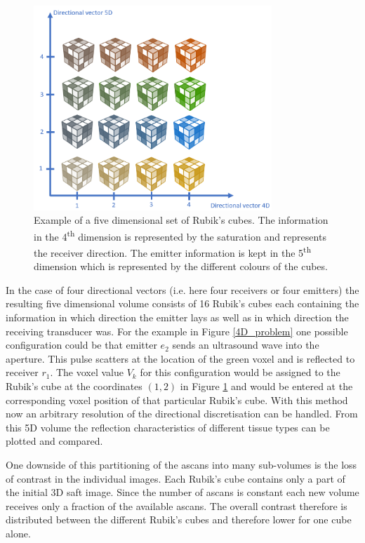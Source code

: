 \begin{figure}[H]
    \centering
    \includegraphics[width=0.8\textwidth]{Graphics/rubicscube5D.png}
    \caption{Example of a five dimensional set of Rubik's cubes. The information in the 4\textsuperscript{th} dimension is represented by the saturation and represents the receiver direction. The emitter information is kept in the 5\textsuperscript{th} dimension which is represented by the different colours of the cubes. 
    }
    \label{5D_rubics}
\end{figure}

In the case of four directional vectors (i.e. here four receivers or four emitters) the resulting five dimensional volume consists of 16 Rubik's cubes each containing the information in which direction the emitter lays as well as in which direction the receiving transducer was. For the example in Figure \ref{4D_problem} one possible configuration could be that emitter $e_2$ sends an ultrasound wave into the aperture. This pulse scatters at the location of the green voxel and is reflected to receiver $r_1$. The voxel value $V_k$ for this configuration would be assigned to the Rubik's cube at the coordinates $(1,2)$ in Figure \ref{5D_rubics} and would be entered at the corresponding voxel position of that particular Rubik's cube.
With this method now an arbitrary resolution of the directional discretisation can be handled. From this 5D volume the reflection characteristics of different tissue types can be plotted and compared. 


One downside of this partitioning of the \acp{ascan} into many sub-volumes is the loss of contrast in the individual images. Each Rubik's cube contains only a part of the initial 3D \ac{saft} image. Since the number of \acp{ascan} is constant each new volume receives only a fraction of the available \acp{ascan}. The overall contrast therefore is distributed between the different Rubik's cubes and therefore lower for one cube alone. 

